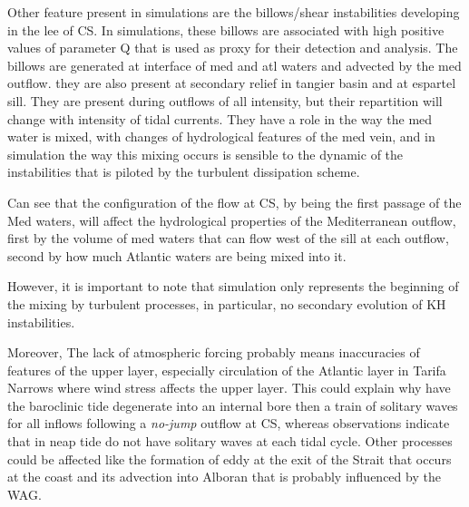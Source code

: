 Other feature present in simulations are the billows/shear instabilities developing in the lee of CS. In simulations, these billows are associated with high positive values of parameter Q that is used as proxy for their detection and analysis. The billows are generated at interface of med and atl waters and advected by the med outflow.   they are also present at secondary relief in tangier basin and at espartel sill. They are present during outflows of all intensity, but their repartition will change with intensity of tidal currents. They have a role in the way the med water is mixed, with changes of hydrological features of the med vein, and in simulation the way this mixing occurs is sensible to the dynamic of the instabilities that is piloted by the turbulent dissipation scheme.


 Can see that the configuration of the flow at CS, by being the first passage of the Med waters, will affect the hydrological properties of the Mediterranean outflow, first by the volume of med waters that can flow west of the sill at each outflow, second by how much Atlantic waters are being mixed into it.

However, it is important to note that simulation only represents the beginning of the mixing by turbulent processes, in particular, no secondary evolution of KH instabilities.


Moreover, The lack of atmospheric forcing probably means inaccuracies of features of the upper layer, especially circulation of the Atlantic layer in Tarifa Narrows where wind stress affects the upper layer. This could explain why have the baroclinic tide degenerate into an internal bore then a train of solitary waves for all inflows following a \textit{no-jump} outflow at CS, whereas observations indicate that in neap tide do not have solitary waves at each tidal cycle. Other processes could be affected like the formation of eddy at the exit of the Strait that occurs at the coast and its advection into Alboran that is probably influenced by the WAG.
